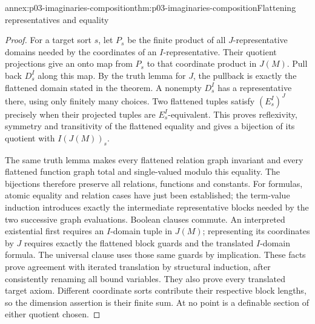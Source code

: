 \begin{annexitem}{annex:p03-imaginaries-composition}{thm:p03-imaginaries-composition}{Flattening representatives and equality}
\begin{proof}
For a target sort \(s\), let \(P_s\) be the finite product of all
\(J\)-representative domains needed by the coordinates of an
\(I\)-representative. Their quotient projections give an onto map from
\(P_s\) to that coordinate product in \(J(M)\). Pull back \(D_s^I\)
along this map. By the truth lemma for \(J\), the pullback is exactly the
flattened domain stated in the theorem. A nonempty \(D_s^I\) has a
representative there, using only finitely many choices. Two flattened tuples
satisfy \((E_s^I)^J\) precisely when their projected tuples are
\(E_s^I\)-equivalent. This proves reflexivity, symmetry and transitivity
of the flattened equality and gives a bijection of its quotient with
\(I(J(M))_s\).

The same truth lemma makes every flattened relation graph invariant and every
flattened function graph total and single-valued modulo this equality.
The bijections therefore preserve all relations, functions and constants.
For formulas, atomic equality and relation cases have just been established;
the term-value induction introduces exactly the intermediate representative
blocks needed by the two successive graph evaluations. Boolean clauses
commute. An interpreted existential first requires an \(I\)-domain tuple
in \(J(M)\); representing its coordinates by \(J\) requires exactly
the flattened block guards and the translated \(I\)-domain formula.
The universal clause uses those same guards by implication. These facts prove
agreement with iterated translation by structural induction, after consistently
renaming all bound variables. They also prove every translated target axiom.
Different coordinate sorts contribute their respective block lengths, so the
dimension assertion is their finite sum. At no point is a definable section
of either quotient chosen.
\end{proof}
\end{annexitem}

